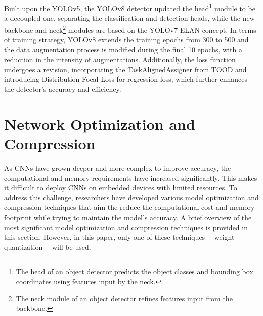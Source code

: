 Built upon the YOLOv5, the YOLOv8 detector updated the head\footnote{The head of
an object detector predicts the object classes and bounding box coordinates
using features input by the neck.} module to be a decoupled one, separating the
classification and detection heads, while the new backbone and neck\footnote{The
neck module of an object detector refines features input from the backbone.}
modules are based on the YOLOv7 ELAN concept. In terms of training strategy,
YOLOv8 extends the training epochs from 300 to 500 and the data augmentation
process is modified during the final 10 epochs, with a reduction in the
intensity of augmentations. Additionally, the loss function undergoes a
revision, incorporating the TaskAlignedAssigner from TOOD and introducing
Distribution Focal Loss for regression loss, which further enhances
the detector's accuracy and efficiency.









\section{Network Optimization and Compression}

As CNNs have grown deeper and more complex to improve accuracy, the
computational and memory requirements have increased significantly. This makes
it difficult to deploy CNNs on embedded devices with limited resources. To
address this challenge, researchers have developed various model optimization
and compression techniques that aim the reduce the computational cost and memory
footprint while trying to maintain the model's accuracy. A brief overview of the
most significant model optimization and compression techniques is provided in
this section. However, in this paper, only one of these techniques\,---\,weight
quantization\,---\,will be used.


